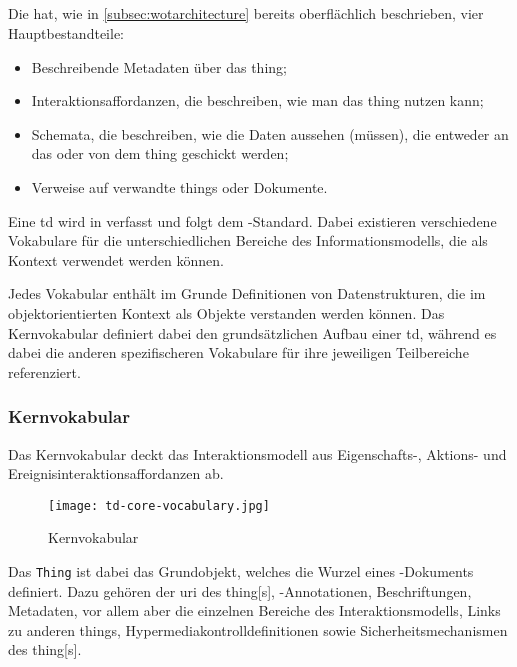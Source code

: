 \subsection{}\label{subsec:wottd}

Die  \autocite{w3c.wot.td.20200623} hat, wie in \autoref{subsec:wotarchitecture} bereits oberflächlich beschrieben, vier Hauptbestandteile:

\begin{itemize}
  \item Beschreibende Metadaten über das \gls{thing};
  \item Interaktionsaffordanzen, die beschreiben, wie man das \gls{thing} nutzen kann;
  \item Schemata, die beschreiben, wie die Daten aussehen (müssen), die entweder an das oder von dem \gls{thing} geschickt werden;
  \item Verweise auf verwandte \glspl{thing} oder Dokumente.
\end{itemize}

Eine \gls{td} wird in  verfasst und folgt dem -Standard. Dabei existieren verschiedene Vokabulare für die unterschiedlichen Bereiche des Informationsmodells, die als Kontext verwendet werden können.

Jedes Vokabular enthält im Grunde Definitionen von Datenstrukturen, die im objektorientierten Kontext als Objekte verstanden werden können. Das Kernvokabular definiert dabei den grundsätzlichen Aufbau einer \gls{td}, während es dabei die anderen spezifischeren Vokabulare für ihre jeweiligen Teilbereiche referenziert.

\subsubsection{Kernvokabular}

Das Kernvokabular deckt das Interaktionsmodell aus Eigenschafts-, Aktions- und Ereignisinteraktionsaffordanzen ab.

\begin{figure}[H]
  \centering
  \texttt{[image: td-core-vocabulary.jpg]}
  \caption{ Kernvokabular}\label{fig:td_core_vocabulary}
\end{figure}

Das \lstinline{Thing} ist dabei das Grundobjekt, welches die Wurzel eines -Dokuments definiert. Dazu gehören der \gls{uri} des \gls{thing}[s], -Annotationen, Beschriftungen, Metadaten, vor allem aber die einzelnen Bereiche des Interaktionsmodells, Links zu anderen \glspl{thing}, Hypermediakontrolldefinitionen sowie Sicherheitsmechanismen des \gls{thing}[s].

